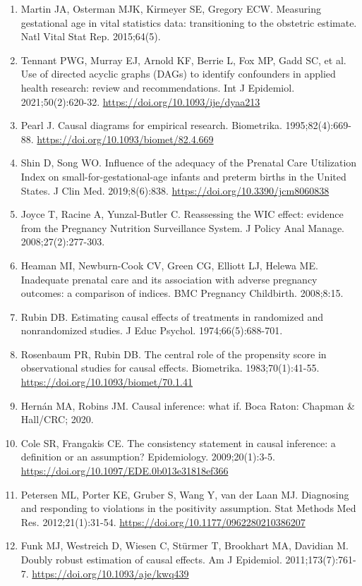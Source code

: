 {\begin{enumerate}[leftmargin=2.4em,labelsep=0.4em,itemsep=2pt,parsep=0pt,label={\arabic*.}]
\item Martin JA, Osterman MJK, Kirmeyer SE, Gregory ECW. Measuring gestational age in vital statistics data: transitioning to the obstetric estimate. Natl Vital Stat Rep. 2015;64(5).
\item Tennant PWG, Murray EJ, Arnold KF, Berrie L, Fox MP, Gadd SC, et al. Use of directed acyclic graphs (DAGs) to identify confounders in applied health research: review and recommendations. Int J Epidemiol. 2021;50(2):620-32. \url{https://doi.org/10.1093/ije/dyaa213}
\item Pearl J. Causal diagrams for empirical research. Biometrika. 1995;82(4):669-88. \url{https://doi.org/10.1093/biomet/82.4.669}
\item Shin D, Song WO. Influence of the adequacy of the Prenatal Care Utilization Index on small-for-gestational-age infants and preterm births in the United States. J Clin Med. 2019;8(6):838. \url{https://doi.org/10.3390/jcm8060838}
\item Joyce T, Racine A, Yunzal-Butler C. Reassessing the WIC effect: evidence from the Pregnancy Nutrition Surveillance System. J Policy Anal Manage. 2008;27(2):277-303.
\item Heaman MI, Newburn-Cook CV, Green CG, Elliott LJ, Helewa ME. Inadequate prenatal care and its association with adverse pregnancy outcomes: a comparison of indices. BMC Pregnancy Childbirth. 2008;8:15.
\item Rubin DB. Estimating causal effects of treatments in randomized and nonrandomized studies. J Educ Psychol. 1974;66(5):688-701.
\item Rosenbaum PR, Rubin DB. The central role of the propensity score in observational studies for causal effects. Biometrika. 1983;70(1):41-55. \url{https://doi.org/10.1093/biomet/70.1.41}
\item Hern\'an MA, Robins JM. Causal inference: what if. Boca Raton: Chapman \& Hall/CRC; 2020.
\item Cole SR, Frangakis CE. The consistency statement in causal inference: a definition or an assumption? Epidemiology. 2009;20(1):3-5. \url{https://doi.org/10.1097/EDE.0b013e31818ef366}
\item Petersen ML, Porter KE, Gruber S, Wang Y, van der Laan MJ. Diagnosing and responding to violations in the positivity assumption. Stat Methods Med Res. 2012;21(1):31-54. \url{https://doi.org/10.1177/0962280210386207}
\item Funk MJ, Westreich D, Wiesen C, St\"urmer T, Brookhart MA, Davidian M. Doubly robust estimation of causal effects. Am J Epidemiol. 2011;173(7):761-7. \url{https://doi.org/10.1093/aje/kwq439}

\end{enumerate}}
